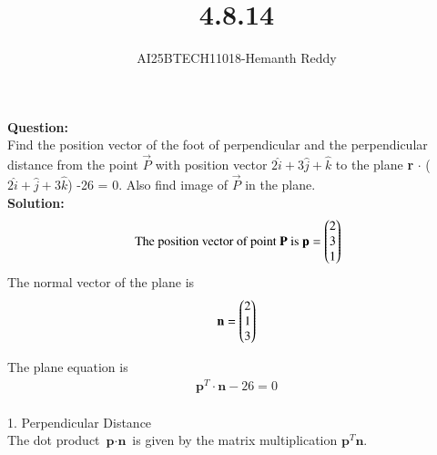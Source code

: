 \documentclass[journal]{IEEEtran}
\begin{document}

\vspace{3cm}

\title{4.8.14}
\author{AI25BTECH11018-Hemanth Reddy}
 \maketitle
{\let\newpage\relax\maketitle}

\renewcommand{\thefigure}{\theenumi}
\renewcommand{\thetable}{\theenumi}
\setlength{\intextsep}{10pt} %


\renewcommand{\thetable}{\theenumi}

\textbf{Question:}\\

Find the position vector of the foot of perpendicular and the perpendicular distance from the point  $ \vec{P}$ with position vector $  2\hat{i}  + 3  \hat{j}  + \hat{k} $ to the plane \textbf{r} $\cdot$ ( $ 2\hat{i}  +   \hat{j}  + 3\hat{k}$) -26 = 0.
 Also find image of $ \vec{P}$  in the plane.\\
\textbf{Solution:}\\
\begin{align}
   \text{ The position vector of point }  \mathbf{P} \text{ is }
  \textbf{p} = \begin{pmatrix} 2 \\ 3 \\ 1 \end{pmatrix} 
\end{align}
 The normal vector of the plane is 
\begin{align}
    \textbf{n} = \begin{pmatrix} 2 \\ 1 \\ 3 \end{pmatrix}
\end{align}



The plane equation is
\begin{align}
    \textbf{p}^T \cdot \textbf{n} - 26 = 0
\end{align} \\

1. Perpendicular Distance\\

The dot product $\textbf{p} \cdot \textbf{n}$ is given by the matrix multiplication $\textbf{p}^T \textbf{n}$.\\
\end{document}
